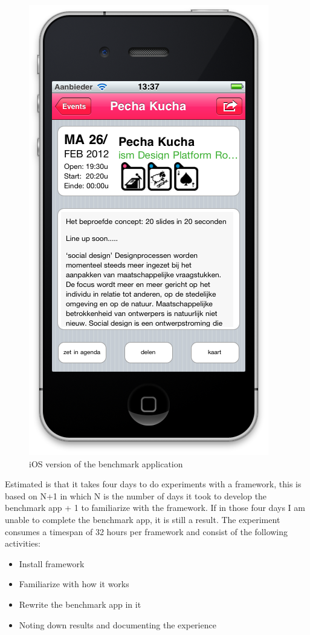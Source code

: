 \begin{figure}
\begin{minipage}{2.2in}
		\includegraphics[scale=0.15]{images/benchmarkapp02.png}
	\end{minipage}%
	\caption{iOS version of the benchmark application}%
	\label{fig:1figs}%
\end{figure}



Estimated is that it takes four days to do experiments with a framework, this is based on N+1 in which N is the number of days it took to develop the benchmark app + 1 to familiarize with the framework. If in those four days I am unable to complete the benchmark app, it is still a result. The experiment consumes a timespan of 32 hours per framework and consist of the following activities:

\begin{itemize}
	\item Install framework
	\item Familiarize with how it works
	\item Rewrite the benchmark app in it
	\item Noting down results and documenting the experience
\end{itemize}

